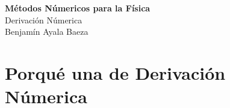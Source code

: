 \documentclass[twoside]{article}
\begin{document}
\thispagestyle{plainfirst}

\begin{tcolorbox}[portada]
    \centering
    {\Huge \bfseries Métodos Númericos para la Física}\\[0.5cm]
    {\LARGE Derivación Númerica}\\[0.5cm]
    {\large Benjamín Ayala Baeza}
\end{tcolorbox}



\section{Porqué una de Derivación Númerica}

\lipsum[1-8]
\end{document}
